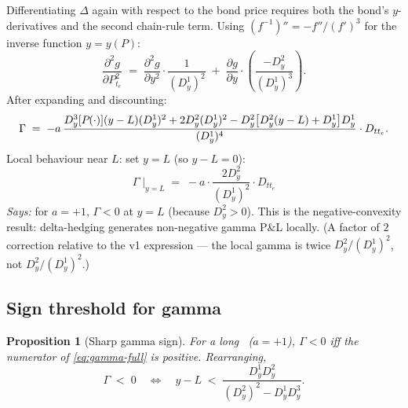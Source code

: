 \documentclass[11pt,a4paper]{article}
\newcommand{\Tlock}{\text{T-Lock}}
\newcommand{\dD}[1]{D_{y}^{#1}}
\newtheorem{proposition}{Proposition}
\begin{document}
Differentiating $\Delta$ again with respect to the bond price requires
both the bond's $y$-derivatives and the second chain-rule term. Using
$(f^{-1})'' = -f''/(f')^3$ for the inverse function $y = y(P)$:
\begin{equation}\label{eq:gamma-derivation}
\frac{\partial^2 g}{\partial P_{t_e}^2}
\;=\; \frac{\partial^2 g}{\partial y^2}\!\cdot\! \frac{1}{(\dD{1})^2}
   \;+\; \frac{\partial g}{\partial y}\!\cdot\!\left(\!\frac{-\dD{2}}{(\dD{1})^3}\!\right).
\end{equation}
After expanding and discounting:
\begin{equation}\label{eq:gamma-full}
  \Gamma \;=\; -a\, \frac{
    \dD{3}[\Bond{}{\cdot}](y-L)(\dD{1})^2
    + 2\dD{2}(\dD{1})^2
    - \dD{2}\bigl[\dD{2}(y-L) + \dD{1}\bigr]\dD{1}
  }{(\dD{1})^4} \cdot D_{tt_e}.
\end{equation}
Local behaviour near $L$: set $y = L$ (so $y - L = 0$):
\begin{equation}\label{eq:gamma-local}
\boxed{\;
\Gamma \;\big|_{y=L} \;=\; -a \cdot \frac{2\dD{2}}{(\dD{1})^2} \cdot D_{tt_e} \;
}
\end{equation}
\textit{Says:} for $a=+1$, $\Gamma < 0$ at $y = L$ (because
$\dD{2} > 0$). This is the negative-convexity result: delta-hedging
generates non-negative gamma P\&L locally. (A factor of $2$ correction
relative to the v1 expression --- the local gamma is twice
$\dD{2}/(\dD{1})^2$, not $\dD{2}/(\dD{1})^2$.)

\subsection{Sign threshold for gamma}

\begin{proposition}[Sharp gamma sign]\label{prop:gamma-sign}
For a long \Tlock\ ($a = +1$), $\Gamma < 0$ iff the numerator of
\eqref{eq:gamma-full} is positive. Rearranging,
\begin{equation}\label{eq:gamma-bound}
\Gamma \;<\; 0
\quad \iff \quad
y - L \;<\; \frac{\dD{1}\dD{2}}{(\dD{2})^2 - \dD{1}\dD{3}}.
\end{equation}
\end{proposition}
\end{document}
